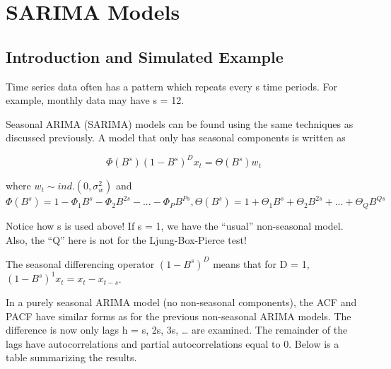 \documentclass[
]{book}
\theoremstyle{definition}
\theoremstyle{definition}
\theoremstyle{definition}
\theoremstyle{definition}
\theoremstyle{remark}
\begin{document}
\hypertarget{sarima-models}{%
\chapter{SARIMA Models}\label{sarima-models}}

\hypertarget{introduction-and-simulated-example}{%
\section{Introduction and Simulated Example}\label{introduction-and-simulated-example}}

Time series data often has a pattern which repeats every s time periods. For example, monthly data may have s = 12.

Seasonal ARIMA (SARIMA) models can be found using the same techniques as discussed previously. A model that only has seasonal components is written as

\[\Phi(B^s)(1-B^s)^Dx_t=\Theta(B^s)w_t\]

where \(w_t \sim ind.(0, \sigma_w^2)\) and \(\Phi(B^s)=1-\Phi_1B^s-\Phi_2B^{2s}-...-\Phi_PB^{Ps}, \Theta(B^s)=1+\Theta_1B^s+\Theta_2B^{2s}+...+\Theta_QB^{Qs}\)

Notice how s is used above! If s = 1, we have the ``usual'' non-seasonal model. Also, the ``Q'' here is not for the Ljung-Box-Pierce test!

The seasonal differencing operator \((1-B^s)^D\) means that for D = 1,\((1-B^s)^1x_t=x_t-x_{t-s}\).

In a purely seasonal ARIMA model (no non-seasonal components), the ACF and PACF have similar forms as for the previous non-seasonal ARIMA models. The difference is now only lags h = s, 2s, 3s, \ldots{} are examined. The remainder of the lags have autocorrelations and partial autocorrelations equal to 0. Below is a table summarizing the results.
\end{document}
